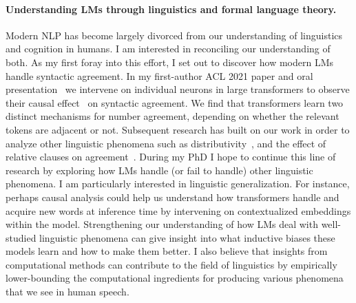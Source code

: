 \documentclass[11pt]{article}
\begin{document}
\paragraph{Understanding LMs through linguistics and formal language theory.}
Modern NLP has become largely divorced 
from our understanding of linguistics and cognition in humans.
I am interested in reconciling our understanding of both.
As my first foray into this effort, I set out to 
discover how modern LMs handle syntactic agreement.
In my first-author ACL 2021 paper and oral presentation~\cite{Finlayson2021CausalAO}
we intervene on individual neurons in large transformers 
to observe their causal effect~\cite{Pearl2001DirectAI} on syntactic agreement.
We find that transformers learn 
two distinct mechanisms for number agreement,
depending on whether the relevant tokens are adjacent or not.
Subsequent research has built on our work 
in order to analyze other linguistic phenomena 
such as distributivity~\cite{Ban2022TestingPL},
and the effect of relative clauses on agreement~\cite{Ravfogel2021CounterfactualIR}.
During my PhD I hope to continue this line of research 
by exploring how LMs handle (or fail to handle) 
other linguistic phenomena. 
I am particularly interested in linguistic generalization.\footnotemark
{}
For instance, perhaps causal analysis could help us understand
how transformers handle and acquire new words at inference time
by intervening on contextualized embeddings within the model.
Strengthening our understanding of how 
LMs deal with well-studied linguistic phenomena
can give insight into what inductive biases these models learn 
and how to make them better.\footnotemark 
{}
I also believe that insights from computational methods 
can contribute to the field of linguistics
by empirically lower-bounding the computational ingredients 
for producing various phenomena that we see in human speech.\footnotemark
{} 
\end{document}

